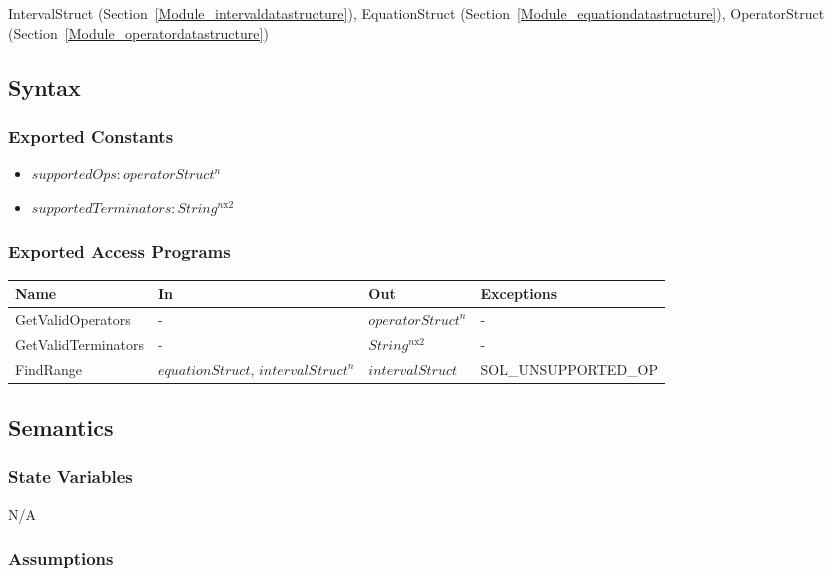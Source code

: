\documentclass[12pt, titlepage]{article}
\begin{document}
IntervalStruct (Section~\ref{Module_intervaldatastructure}), EquationStruct 
(Section~\ref{Module_equationdatastructure}), OperatorStruct (Section~\ref{Module_operatordatastructure})

\subsection{Syntax}

\subsubsection{Exported Constants}

\begin{itemize}
	\item $supportedOps : operatorStruct^n$
	\item $supportedTerminators : String^{n\text{x}2}$
\end{itemize}

\subsubsection{Exported Access Programs}

\begin{center}
	\begin{tabular}{p{3.5cm} p{3cm} p{3cm} p{5cm}}
		\hline
		\textbf{Name} & \textbf{In} & \textbf{Out} & \textbf{Exceptions} \\
		\hline
		GetValidOperators & - & $operatorStruct^n$ & -\\
		GetValidTerminators & - & $String^{n\text{x}2}$ & -\\
		\multirow{2}{3.1cm}{FindRange} & $equationStruct$, $intervalStruct^n$ & 
		\multirow{2}{3cm}{$intervalStruct$} & 
		\multirow{2}{5cm}{SOL\_UNSUPPORTED\_OP}\\
		\hline
	\end{tabular}
\end{center}

\subsection{Semantics}

\subsubsection{State Variables}

N/A

\subsubsection{Assumptions}
\end{document}
